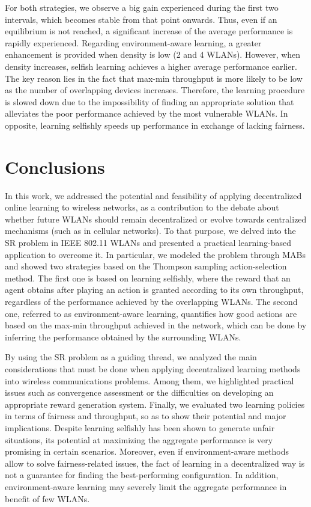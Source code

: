 \documentclass[preprint,12pt]{elsarticle}
\begin{document}
For both strategies, we observe a big gain experienced during the first two intervals, which becomes stable from that point onwards. Thus, even if an equilibrium is not reached, a significant increase of the average performance is rapidly experienced. Regarding environment-aware learning, a greater enhancement is provided when density is low (2 and 4 WLANs). However, when density increases, selfish learning achieves a higher average performance earlier. The key reason lies in the fact that max-min throughput is more likely to be low as the number of overlapping devices increases. Therefore, the learning procedure is slowed down due to the impossibility of finding an appropriate solution that alleviates the poor performance achieved by the most vulnerable WLANs. In opposite, learning selfishly speeds up performance in exchange of lacking fairness.

\section{Conclusions}
\label{section:conclusions}		
In this work, we addressed the potential and feasibility of applying decentralized online learning to wireless networks, as a contribution to the debate about whether future WLANs should remain decentralized or evolve towards centralized mechanisms (such as in cellular networks). To that purpose, we delved into the SR problem in IEEE 802.11 WLANs and presented a practical learning-based application to overcome it. In particular, we modeled the problem through MABs and showed two strategies based on the Thompson sampling action-selection method. The first one is based on learning selfishly, where the reward that an agent obtains after playing an action is granted according to its own throughput, regardless of the performance achieved by the overlapping WLANs. The second one, referred to as environment-aware learning, quantifies how good actions are based on the max-min throughput achieved in the network, which can be done by inferring the performance obtained by the surrounding WLANs. 

By using the SR problem as a guiding thread, we analyzed the main considerations that must be done when applying decentralized learning methods into wireless communications problems. Among them, we highlighted practical issues such as convergence assessment or the difficulties on developing an appropriate reward generation system. Finally, we evaluated two learning policies in terms of fairness and throughput, so as to show their potential and major implications. Despite learning selfishly has been shown to generate unfair situations, its potential at maximizing the aggregate performance is very promising in certain scenarios. Moreover, even if environment-aware methods allow to solve fairness-related issues, the fact of learning in a decentralized way is not a guarantee for finding the best-performing configuration. In addition, environment-aware learning may severely limit the aggregate performance in benefit of few WLANs. 
\end{document}
